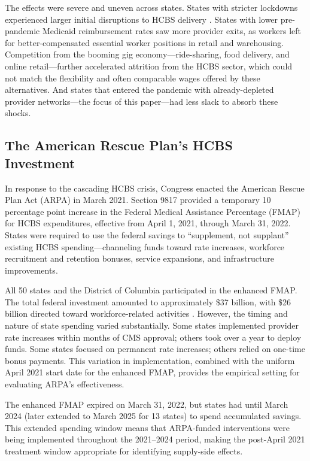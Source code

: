 \documentclass[12pt]{article}
\begin{document}
The effects were severe and uneven across states. States with stricter lockdowns experienced larger initial disruptions to HCBS delivery \citep{kff2022hcbs}. States with lower pre-pandemic Medicaid reimbursement rates saw more provider exits, as workers left for better-compensated essential worker positions in retail and warehousing. Competition from the booming gig economy---ride-sharing, food delivery, and online retail---further accelerated attrition from the HCBS sector, which could not match the flexibility and often comparable wages offered by these alternatives. And states that entered the pandemic with already-depleted provider networks---the focus of this paper---had less slack to absorb these shocks.

\subsection{The American Rescue Plan's HCBS Investment}

In response to the cascading HCBS crisis, Congress enacted the American Rescue Plan Act (ARPA) in March 2021. Section 9817 provided a temporary 10 percentage point increase in the Federal Medical Assistance Percentage (FMAP) for HCBS expenditures, effective from April 1, 2021, through March 31, 2022. States were required to use the federal savings to ``supplement, not supplant'' existing HCBS spending---channeling funds toward rate increases, workforce recruitment and retention bonuses, service expansions, and infrastructure improvements.

All 50 states and the District of Columbia participated in the enhanced FMAP. The total federal investment amounted to approximately \$37 billion, with \$26 billion directed toward workforce-related activities \citep{advancingstates2024}. However, the timing and nature of state spending varied substantially. Some states implemented provider rate increases within months of CMS approval; others took over a year to deploy funds. Some states focused on permanent rate increases; others relied on one-time bonus payments. This variation in implementation, combined with the uniform April 2021 start date for the enhanced FMAP, provides the empirical setting for evaluating ARPA's effectiveness.

The enhanced FMAP expired on March 31, 2022, but states had until March 2024 (later extended to March 2025 for 13 states) to spend accumulated savings. This extended spending window means that ARPA-funded interventions were being implemented throughout the 2021--2024 period, making the post-April 2021 treatment window appropriate for identifying supply-side effects.
\end{document}
